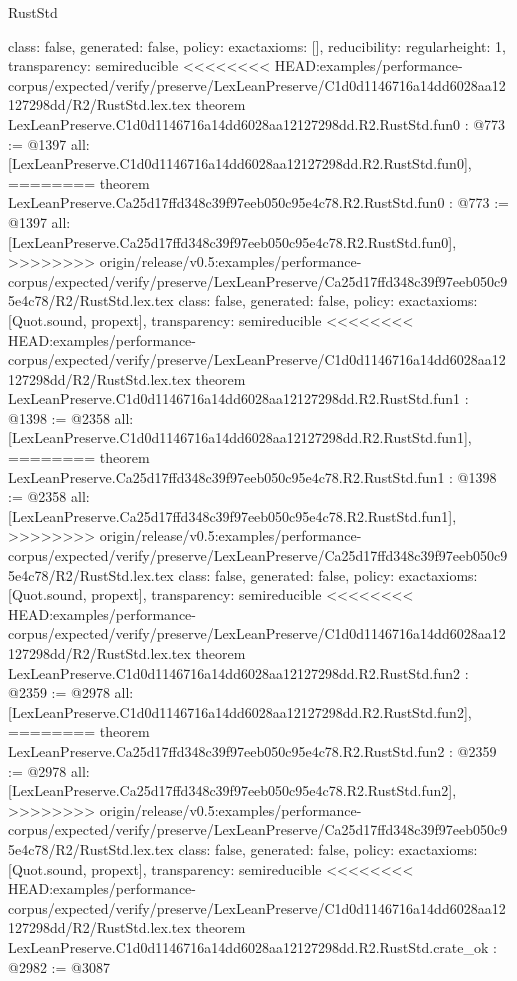 \begin{lexlean}{RustStd}
\begin{coremodule}
{\begin{coremodule}
{{{  class: false,
  generated: false,
  policy: exact{axioms: []},
  reducibility: regular{height: 1},
  transparency: semireducible
}
<<<<<<<< HEAD:examples/performance-corpus/expected/verify/preserve/LexLeanPreserve/C1d0d1146716a14dd6028aa12127298dd/R2/RustStd.lex.tex
theorem LexLeanPreserve.C1d0d1146716a14dd6028aa12127298dd.R2.RustStd.fun0 : @773 := @1397 {
  all: [LexLeanPreserve.C1d0d1146716a14dd6028aa12127298dd.R2.RustStd.fun0],
========
theorem LexLeanPreserve.Ca25d17ffd348c39f97eeb050c95e4c78.R2.RustStd.fun0 : @773 := @1397 {
  all: [LexLeanPreserve.Ca25d17ffd348c39f97eeb050c95e4c78.R2.RustStd.fun0],
>>>>>>>> origin/release/v0.5:examples/performance-corpus/expected/verify/preserve/LexLeanPreserve/Ca25d17ffd348c39f97eeb050c95e4c78/R2/RustStd.lex.tex
  class: false,
  generated: false,
  policy: exact{axioms: [Quot.sound, propext]},
  transparency: semireducible
}
<<<<<<<< HEAD:examples/performance-corpus/expected/verify/preserve/LexLeanPreserve/C1d0d1146716a14dd6028aa12127298dd/R2/RustStd.lex.tex
theorem LexLeanPreserve.C1d0d1146716a14dd6028aa12127298dd.R2.RustStd.fun1 : @1398 := @2358 {
  all: [LexLeanPreserve.C1d0d1146716a14dd6028aa12127298dd.R2.RustStd.fun1],
========
theorem LexLeanPreserve.Ca25d17ffd348c39f97eeb050c95e4c78.R2.RustStd.fun1 : @1398 := @2358 {
  all: [LexLeanPreserve.Ca25d17ffd348c39f97eeb050c95e4c78.R2.RustStd.fun1],
>>>>>>>> origin/release/v0.5:examples/performance-corpus/expected/verify/preserve/LexLeanPreserve/Ca25d17ffd348c39f97eeb050c95e4c78/R2/RustStd.lex.tex
  class: false,
  generated: false,
  policy: exact{axioms: [Quot.sound, propext]},
  transparency: semireducible
}
<<<<<<<< HEAD:examples/performance-corpus/expected/verify/preserve/LexLeanPreserve/C1d0d1146716a14dd6028aa12127298dd/R2/RustStd.lex.tex
theorem LexLeanPreserve.C1d0d1146716a14dd6028aa12127298dd.R2.RustStd.fun2 : @2359 := @2978 {
  all: [LexLeanPreserve.C1d0d1146716a14dd6028aa12127298dd.R2.RustStd.fun2],
========
theorem LexLeanPreserve.Ca25d17ffd348c39f97eeb050c95e4c78.R2.RustStd.fun2 : @2359 := @2978 {
  all: [LexLeanPreserve.Ca25d17ffd348c39f97eeb050c95e4c78.R2.RustStd.fun2],
>>>>>>>> origin/release/v0.5:examples/performance-corpus/expected/verify/preserve/LexLeanPreserve/Ca25d17ffd348c39f97eeb050c95e4c78/R2/RustStd.lex.tex
  class: false,
  generated: false,
  policy: exact{axioms: [Quot.sound, propext]},
  transparency: semireducible
}
<<<<<<<< HEAD:examples/performance-corpus/expected/verify/preserve/LexLeanPreserve/C1d0d1146716a14dd6028aa12127298dd/R2/RustStd.lex.tex
theorem LexLeanPreserve.C1d0d1146716a14dd6028aa12127298dd.R2.RustStd.crate_ok : @2982 := @3087 {
}}}}}}
\end{coremodule}}
\end{coremodule}
\end{lexlean}
